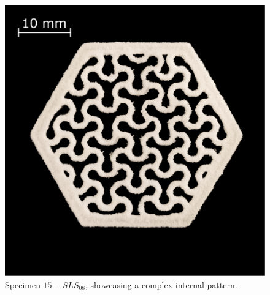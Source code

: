\documentclass{article}
\begin{document}
        \begin{figure}[h!]
            \centering
            \includegraphics[width=\textwidth]{Pictures/Printed_parts/Fixed/organic_pattern_hexagon.eps}
            \caption{Specimen $15-SLS_{08}$, showcasing a complex internal pattern.}
            \label{fig:printed_specimens_organicpattern}
        \end{figure}
\end{document}
